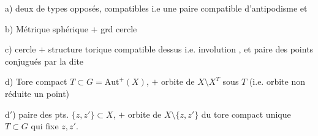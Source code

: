 a) deux  de types opposés, compatibles i.e une paire compatible d'antipodisme et 

b) Métrique sphérique $+$ grd cercle

c) cercle $+$ structure torique compatible dessus i.e. involution , et paire des points conjugués par la dite

d) Tore compact $T\subset G=\mathrm{Aut}^{+}(X)$, $+$ orbite de $X\setminus X^T$ sous $T$ (i.e. orbite non réduite  un point)

d$'$) paire des pts. $\{z,z'\}\subset X$, $+$ orbite de $X\setminus\{z,z'\}$ du tore compact unique $T\subset G$ qui fixe $z,z'$.
